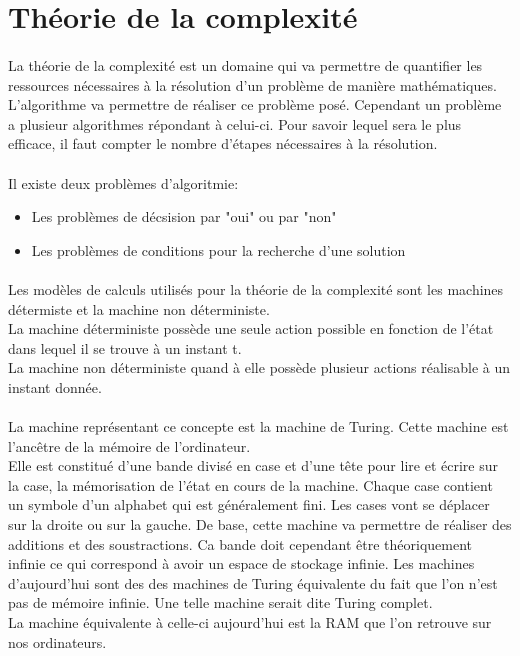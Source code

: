 \documentclass[12pt]{article}
\begin{document}
	\section{Théorie de la complexité}

		\paragraph{}

			La théorie de la complexité est un domaine qui va permettre de quantifier les ressources nécessaires à la résolution d'un problème de manière mathématiques.\\
L'algorithme va permettre de réaliser ce problème posé. Cependant un problème a plusieur algorithmes répondant à celui-ci. Pour savoir lequel sera le plus efficace, il faut compter le nombre d'étapes nécessaires à la résolution.
	\paragraph{}
		Il existe deux problèmes d'algoritmie:

		\begin{itemize}

			\item Les problèmes de décsision par "oui" ou par "non"
			\item Les problèmes de conditions pour la recherche d'une solution

		\end{itemize}

	\paragraph{}
		Les modèles de calculs utilisés pour la théorie de la complexité sont les machines détermiste et la machine non déterministe.\\
La machine déterministe possède une seule action possible en fonction de l'état dans lequel il se trouve à un instant t.\\
La machine non déterministe quand à elle possède plusieur actions réalisable à un instant donnée. 

	\paragraph{}
		La machine représentant ce concepte est la machine de Turing. Cette machine est l'ancêtre de la mémoire de l'ordinateur.\\
Elle est constitué d'une bande divisé en case et d'une tête pour lire et écrire sur la case, la mémorisation de l'état en cours de la machine. Chaque case contient un symbole d'un alphabet qui est généralement fini. Les cases vont se déplacer sur la droite ou sur la gauche. De base, cette machine va permettre de réaliser des additions et des soustractions. Ca bande doit cependant être théoriquement infinie ce qui correspond à avoir un espace de stockage infinie. Les machines d'aujourd'hui sont des des machines de Turing équivalente du fait que l'on n'est pas de mémoire infinie. Une telle machine serait dite Turing complet.\\
La machine équivalente à celle-ci aujourd'hui est la RAM que l'on retrouve sur nos ordinateurs.
\end{document}
